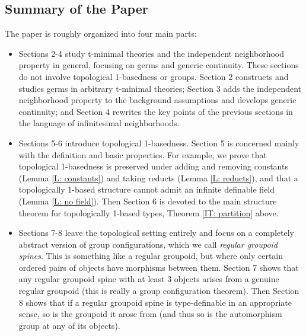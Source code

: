 \documentclass{amsart}
\theoremstyle{definition}
\begin{document}
\subsection{Summary of the Paper}

The paper is roughly organized into four main parts:

\begin{itemize}

\item Sections 2-4 study t-minimal theories and the independent neighborhood property in general, focusing on germs and generic continuity. These sections do not involve topological 1-basedness or groups. Section 2 constructs and studies germs in arbitrary t-minimal theories; Section 3 adds the independent neighborhood property to the background assumptions and develops generic continuity; and Section 4 rewrites the key points of the previous sections in the language of infinitesimal neighborhoods.

\item Sections 5-6 introduce topological 1-basedness. Section 5 is concerned mainly with the definition and basic properties. For example, we prove that topological 1-basedness is preserved under adding and removing constants (Lemma \ref{L: constants}) and taking reducts (Lemma \ref{L: reducts}), and that a topologically 1-based structure cannot admit an infinite definable field (Lemma \ref{L: no field}). Then Section 6 is devoted to the main structure theorem for topologically 1-based types, Theorem \ref{IT: partition} above.

\item Sections 7-8 leave the topological setting entirely and focus on a completely abstract version of group configurations, which we call \textit{regular groupoid spines}. This is something like a regular groupoid, but where only certain ordered pairs of objects have morphisms between them. Section 7 shows that any regular groupoid spine with at least 3 objects arises from a genuine regular groupoid (this is really a group configuration theorem). Then Section 8 shows that if a regular groupoid spine is type-definable in an appropriate sense, so is the groupoid it arose from (and thus so is the automorphism group at any of its objects).


\end{itemize}
\end{document}
